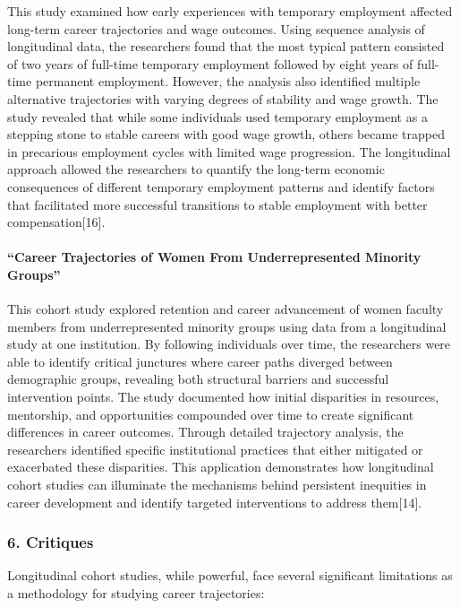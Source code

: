 \documentclass[./main.tex]{subfiles}
\begin{document}
This study examined how early experiences with temporary employment
affected long-term career trajectories and wage outcomes. Using sequence
analysis of longitudinal data, the researchers found that the most
typical pattern consisted of two years of full-time temporary employment
followed by eight years of full-time permanent employment. However, the
analysis also identified multiple alternative trajectories with varying
degrees of stability and wage growth. The study revealed that while some
individuals used temporary employment as a stepping stone to stable
careers with good wage growth, others became trapped in precarious
employment cycles with limited wage progression. The longitudinal
approach allowed the researchers to quantify the long-term economic
consequences of different temporary employment patterns and identify
factors that facilitated more successful transitions to stable
employment with better compensation{[}16{]}.

\paragraph{``Career Trajectories of Women From Underrepresented
Minority
Groups''}\label{career-trajectories-of-women-from-underrepresented-minority-groups}

This cohort study explored retention and career advancement of women
faculty members from underrepresented minority groups using data from a
longitudinal study at one institution. By following individuals over
time, the researchers were able to identify critical junctures where
career paths diverged between demographic groups, revealing both
structural barriers and successful intervention points. The study
documented how initial disparities in resources, mentorship, and
opportunities compounded over time to create significant differences in
career outcomes. Through detailed trajectory analysis, the researchers
identified specific institutional practices that either mitigated or
exacerbated these disparities. This application demonstrates how
longitudinal cohort studies can illuminate the mechanisms behind
persistent inequities in career development and identify targeted
interventions to address them{[}14{]}.

\subsubsection{6. Critiques}\label{critiques}

Longitudinal cohort studies, while powerful, face several significant
limitations as a methodology for studying career trajectories:
\end{document}

